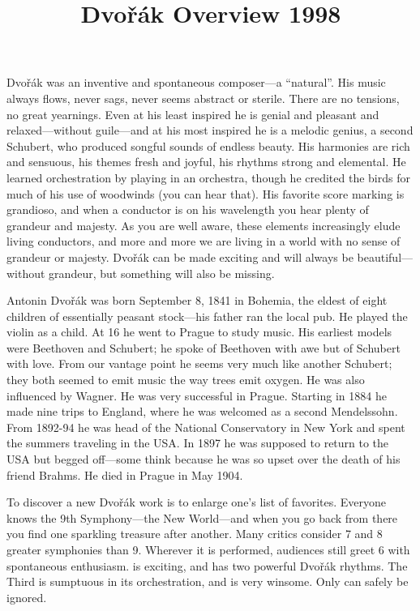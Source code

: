 \documentclass[12pt]{article}%
\begin{document}
\title{Dvořák Overview 1998}
\date{}
\maketitle

\noindent
Dvořák was an inventive and spontaneous composer---a ``natural''.
His music always flows, never sags, never seems abstract or sterile. 
There are no tensions, no great yearnings.
Even at his least inspired he is genial and pleasant and relaxed---without guile---and at his most inspired
he is a melodic genius, a second Schubert, who produced songful sounds of endless
beauty. His harmonies are rich and
sensuous, his themes fresh and joyful, his rhythms strong and elemental. He 
learned orchestration by playing in an orchestra, though he credited 
the birds for much of his use of woodwinds (you can hear that). 
His favorite score marking is grandioso, and when a conductor 
is on his wavelength you hear plenty of grandeur and majesty. 
As you are well aware, these elements increasingly elude living conductors, 
and more and more we are living in a world with no sense of grandeur or majesty. Dvořák can be made exciting
and will always be beautiful---without grandeur, but something will also be missing.

Antonin Dvořák was born September 8, 1841 in Bohemia, the eldest of eight children 
of essentially peasant stock---his father ran the local pub. He played the violin as a child. At 16
he went to Prague to study music. His earliest models were Beethoven and Schubert;
he spoke of Beethoven with awe but of Schubert with love.
From our vantage point he seems very much like another Schubert;
they both seemed to emit music the way trees emit oxygen.
He was also influenced by Wagner. He was very successful in Prague.
Starting in 1884 he made nine trips to England, where he was welcomed as a second Mendelssohn.
From 1892-94 he was head of the National Conservatory 
in New York and spent the summers traveling in the USA. 
In 1897 he was supposed to return to the USA but begged off---some think because
he was so upset over the death of his friend Brahms. He died in Prague in May 1904.

To discover a new Dvořák work is to enlarge one's list of favorites. Everyone knows the 9th Symphony---the New World---and when you go back from there you find one sparkling treasure after another. Many critics consider 7 and 8 greater symphonies than 9. Wherever it is performed, audiences still greet 6 with spontaneous enthusiasm.  is exciting, and  has two powerful Dvořák rhythms. The Third is sumptuous in its orchestration, and  is very winsome. Only  can safely be ignored.
\end{document}
